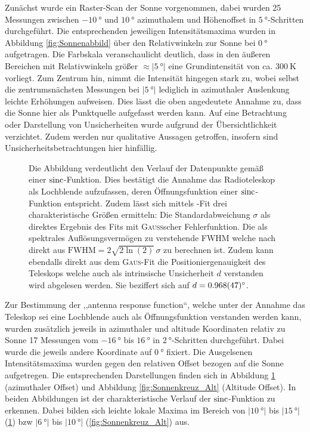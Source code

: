     Zunächst wurde ein Raster-Scan der Sonne vorgenommen, dabei wurden 25 Messungen zwischen $\SI{-10}{\degree}$ und $\SI{10}{\degree}$ azimuthalem und Höhenoffset in $\SI{5}{\degree}$-Schritten durchgeführt.
    Die entsprechenden jeweiligen Intensitätsmaxima wurden in Abbildung \ref{fig:Sonnenabbild} über den Relativwinkeln zur Sonne bei $\SI{0}{\degree}$ aufgetragen.
    Die Farbskala veranschaulicht deutlich, dass in den äußeren Bereichen mit Relativwinkeln größer $\approx \vert \SI{5}{\degree}\vert$ eine Grundintensität von ca. $\SI{300}{\kelvin}$ vorliegt.
    Zum Zentrum hin, nimmt die Intensität hingegen stark zu,
    wobei selbst die zentrumsnächsten Messungen bei $\vert\SI{5}{\degree}\vert$ lediglich in azimuthaler Auslenkung leichte Erhöhungen aufweisen.
    Dies lässt die oben angedeutete Annahme zu, dass die Sonne hier als Punktquelle aufgefasst werden kann.
    Auf eine Betrachtung oder Darstellung von Unsicherheiten wurde aufgrund der Übersichtlichkeit verzichtet. Zudem werden nur qualitative Aussagen getroffen, insofern sind Unsicherheitsbetrachtungen hier hinfällig.

    \begin{figure}[H]
        \centering
        
        \caption[Kreuz-Scan der Sonne, Azimuthaler Offset]{Die Abbildung verdeutlicht den Verlauf der Datenpunkte gemäß einer $\operatorname{sinc}$-Funktion. Dies bestätigt die Annahme das Radioteleskop als Lochblende aufzufassen, deren Öffnungsfunktion einer $\operatorname{sinc}$-Funktion entspricht. Zudem lässt sich mittels -Fit drei charakteristische Größen ermitteln: Die Standardabweichung $\sigma$ als direktes Ergebnis des Fits mit \textsc{Gauß}scher Fehlerfunktion. Die als spektrales Auflösungsvermögen zu verstehende FWHM welche nach \cite{wiki:FWHM} direkt aus $\text{FWHM} = 2\sqrt{2\ln(2)} \, \sigma$ zu berechnen ist. Zudem kann ebendalls direkt aus dem \textsc{Gaus}-Fit die Positioniergenauigkeit des Teleskops welche auch als intrinsische Unsicherheit $d$ verstanden wird abgelesen werden. Sie beziffert sich auf $d = \SI{0.968 \pm 0.047}{\degree}$.}
        \label{fig:Sonnenkreuz_Az}
    \end{figure}

    Zur Bestimmung der ,,antenna response function``,
    welche unter der Annahme das Teleskop sei eine Lochblende auch als Öffnungsfunktion verstanden werden kann,
    wurden zusätzlich jeweils in azimuthaler und altitude Koordinaten relativ zu Sonne 17 Messungen vom $\SI{-16}{\degree}$ bis $\SI{16}{\degree}$ in $\SI{2}{\degree}$-Schritten durchgeführt.
    Dabei wurde die jeweils andere Koordinate auf $\SI{0}{\degree}$ fixiert.
    Die Ausgelsenen Intensitätsmaxima wurden gegen den relativen Offset bezogen auf die Sonne aufgetregen.
    Die entsprechenden Darstellungen finden sich in Abbildung \ref{fig:Sonnenkreuz_Az} (azimuthaler Offset) und Abbildung \ref{fig:Sonnenkreuz_Alt} (Altitude Offset).
    In beiden Abbildungen ist der charakteristische Verlauf der $\operatorname{sinc}$-Funktion zu erkennen. Dabei bilden sich leichte lokale Maxima im Bereich von $\vert\SI{10}{\degree}\vert$ bis $\vert\SI{15}{\degree}\vert$ (\ref{fig:Sonnenkreuz_Az}) bzw $\vert\SI{6}{\degree}\vert$ bis $\vert\SI{10}{\degree}\vert$ (\ref{fig:Sonnenkreuz_Alt}) aus.


